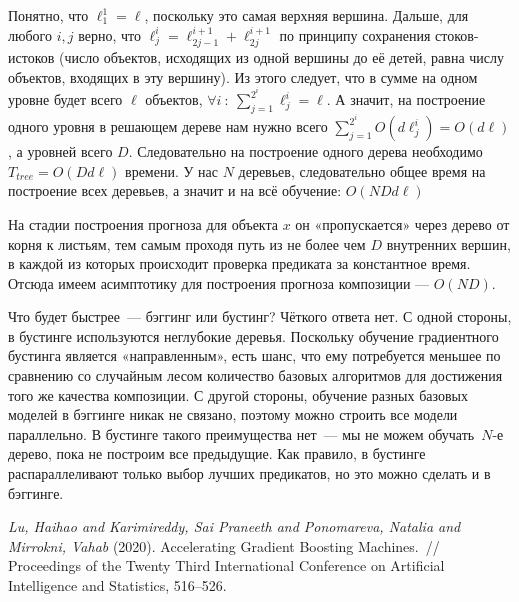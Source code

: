 \documentclass[12pt,fleqn]{article}
\begin{document}
\begin{esSolution}
Понятно, что $\ell^1_1 = \ell$, поскольку это самая верхняя вершина. Дальше, для любого $i, j$ верно, что $\ell^i_j = \ell^{i + 1}_{2j - 1} + \ell^{i + 1}_{2j}$ по принципу сохранения стоков-истоков (число объектов, исходящих из одной вершины до её детей, равна числу объектов, входящих в эту вершину). Из этого следует, что в сумме на одном уровне будет всего $\ell$ объектов, $\forall i ~:~ \sum\limits^{2^i}_{j=1} \ell^i_j = \ell$. А значит, на построение одного уровня в решающем дереве нам нужно всего $\sum\limits^{2^i}_{j=1} O(d\ell^i_j) = O(d\ell)$, а уровней всего $D$. Следовательно на построение одного дерева необходимо $T_{tree} = O(Dd\ell)$ времени. У нас $N$ деревьев, следовательно общее время на построение всех деревьев, а значит и на всё обучение: $O(NDd\ell)$

На стадии построения прогноза для объекта $x$ он «пропускается» через дерево от корня к листьям, тем самым проходя путь из не более чем $D$ внутренних вершин, в каждой из которых происходит проверка предиката за константное время. Отсюда имеем асимптотику для построения прогноза композиции — $O(ND)$.

\end{esSolution}

Что будет быстрее~--- бэггинг или бустинг?
Чёткого ответа нет.
С одной стороны, в бустинге используются неглубокие деревья.
Поскольку обучение градиентного бустинга является «направленным», есть шанс,
что ему потребуется меньшее по сравнению со случайным лесом количество базовых алгоритмов для достижения того же качества композиции.
С другой стороны, обучение разных базовых моделей в бэггинге никак не связано, поэтому можно строить все модели параллельно.
В бустинге такого преимущества нет~--- мы не можем обучать~$N$-е дерево, пока не построим все предыдущие.
Как правило, в бустинге распараллеливают только выбор лучших предикатов, но это можно сделать и в бэггинге.

\begin{thebibliography}{1}
    \emph{Lu, Haihao and Karimireddy, Sai Praneeth and Ponomareva, Natalia and Mirrokni, Vahab} (2020).
    Accelerating Gradient Boosting Machines.~//
    Proceedings of the Twenty Third International Conference on Artificial Intelligence and Statistics,
    516--526.
\end{thebibliography}
\end{document}
